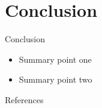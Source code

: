 \section{Conclusion}

\begin{frame}{Conclusion}
  \begin{itemize}
    \item Summary point one
    \item Summary point two
  \end{itemize}
\end{frame}

\begin{frame}{References}
  
  
\end{frame}
